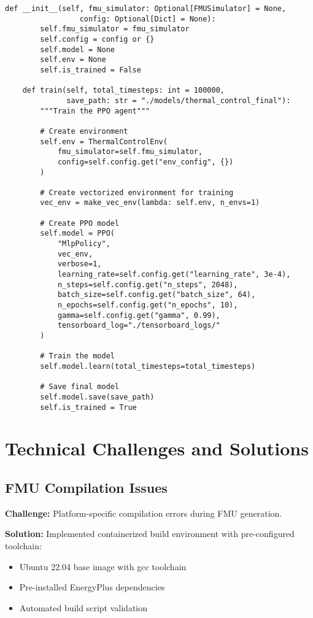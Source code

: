 \documentclass[12pt,a4paper]{article}
\begin{document}
{\begin{lstlisting}[style=python, caption=PPO Agent Implementation]
    def __init__(self, fmu_simulator: Optional[FMUSimulator] = None, 
                 config: Optional[Dict] = None):
        self.fmu_simulator = fmu_simulator
        self.config = config or {}
        self.model = None
        self.env = None
        self.is_trained = False
        
    def train(self, total_timesteps: int = 100000, 
              save_path: str = "./models/thermal_control_final"):
        """Train the PPO agent"""
        
        # Create environment
        self.env = ThermalControlEnv(
            fmu_simulator=self.fmu_simulator,
            config=self.config.get("env_config", {})
        )
        
        # Create vectorized environment for training
        vec_env = make_vec_env(lambda: self.env, n_envs=1)
        
        # Create PPO model
        self.model = PPO(
            "MlpPolicy",
            vec_env,
            verbose=1,
            learning_rate=self.config.get("learning_rate", 3e-4),
            n_steps=self.config.get("n_steps", 2048),
            batch_size=self.config.get("batch_size", 64),
            n_epochs=self.config.get("n_epochs", 10),
            gamma=self.config.get("gamma", 0.99),
            tensorboard_log="./tensorboard_logs/"
        )
        
        # Train the model
        self.model.learn(total_timesteps=total_timesteps)
        
        # Save final model
        self.model.save(save_path)
        self.is_trained = True
\end{lstlisting}

\section{Technical Challenges and Solutions}

\subsection{FMU Compilation Issues}

\textbf{Challenge:} Platform-specific compilation errors during FMU generation.

\textbf{Solution:} Implemented containerized build environment with pre-configured toolchain:
\begin{itemize}
    \item Ubuntu 22.04 base image with gcc toolchain
    \item Pre-installed EnergyPlus dependencies
    \item Automated build script validation
\end{itemize}

}
\end{document}
